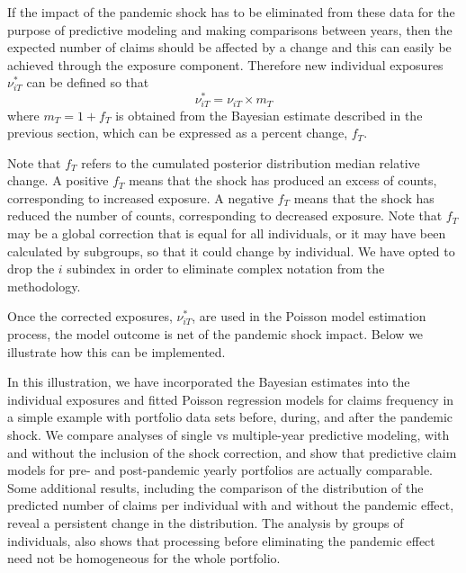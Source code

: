 \documentclass[]{risa}
\begin{document}
If the impact of the pandemic shock has to be eliminated from these data for the purpose of predictive modeling and making comparisons between years, then the expected number of claims should be affected by a change and this can easily be achieved through the exposure component. Therefore new individual exposures $\nu^*_{iT}$ can be defined so that
$$
\nu^*_{iT}=\nu_{iT} \times m_T
$$
where $m_T=1+f_T$ is obtained from the Bayesian estimate described in the previous section, which can be expressed as a percent change, $f_T$. 

Note that $f_T$ refers to the cumulated posterior distribution median relative change. A positive $f_T$ means that the shock has produced an excess of counts, corresponding to increased exposure. A negative $f_T$ means that the shock has reduced the number of counts, corresponding to decreased exposure. Note that $f_T$ may be a global correction that is equal for all individuals, or it may have been calculated by subgroups, so that it could change by individual. We have opted to drop the $i$ subindex in order to eliminate complex notation from the methodology.

Once the corrected exposures, $\nu^*_{iT}$, are used in the Poisson model estimation process, the model outcome is net of the pandemic shock impact. Below we illustrate how this can be implemented.

In this illustration, we have incorporated the Bayesian estimates into the individual exposures and fitted Poisson regression models for claims frequency in a simple example with portfolio data sets before, during,  and after the pandemic shock. We compare analyses of single vs multiple-year predictive modeling, with and without the inclusion of the shock correction, and show that predictive claim models for pre- and post-pandemic yearly portfolios are actually comparable. Some additional results, including the comparison of the distribution of the predicted number of claims per individual with and without the pandemic effect, reveal a persistent change in the distribution. The analysis by groups of individuals, also shows that processing before eliminating the pandemic effect need not be homogeneous for the whole portfolio.
\end{document}
